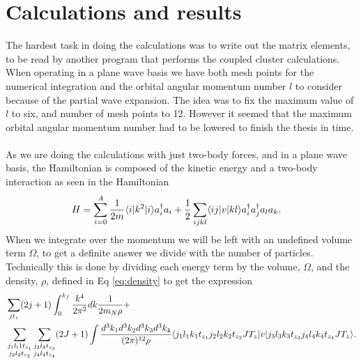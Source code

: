 \chapter{Calculations and results}

The hardest task in doing the calculations was to write out the matrix
elements, to be read by another program that performs the coupled
cluster calculations.%
\\
When operating in a plane wave basis we have both mesh points for the numerical
integration and the orbital angular momentum number $l$  to consider because of
the partial wave expansion. The idea was to fix the maximum value of $l$ to six, and
number of mesh points to 12. However it seemed that the maximum orbital angular
momentum number had to be lowered to finish the thesis in time.\\%
\\
As we are doing the calculations with just two-body forces, and in a plane wave
basis, the Hamiltonian is composed of the kinetic energy  and a
two-body interaction as seen in the Hamiltonian
\begin{equation*}
		\begin{split}
				&H=\sum_{i=0}^A\frac{1}{2m}\langle i|k^2|i\rangle a^\dagger_ia_i + \frac{1}{2}\sum_{ijkl}\langle ij|v|kl\rangle a^\dagger_ia^\dagger_ja_la_k.
		\end{split}
\end{equation*}
When we integrate over the momentum we will be left with an undefined volume term
$\Omega$, to get a definite answer we divide with the number of particles. 
Technically this is done by dividing each energy term by the volume, $\Omega$, and 
the density, $\rho$, defined in Eq \eqref{eq:density} to get the expression
\begin{equation*}
		\begin{split}
			&	 \sum_{jt_z} (2j+1)\int _0^{k_f}\frac{k^4}{2\pi^2}dk\frac{1}{2m_N\rho}+\\
			&	\sum_{\substack{j_1l_l1t_{z_1}\\j_2l_2t_{z_2}}}\sum_{\substack{j_3l_3t_{z_3}\\j_4l_4t_{z_4}}}(2J+1)\int \frac{d^3k_1 d^3k_2 d^3k_3 d^3k_4}{(2\pi)^{12}\rho}\langle j_1l_1k_1t_{z_1}j_2l_2k_2t_{z_2}JT_z|v
				|j_3l_3k_3t_{z_3}j_4l_4k_4t_{z_4}JT_z\rangle.
		\end{split}
\end{equation*}
